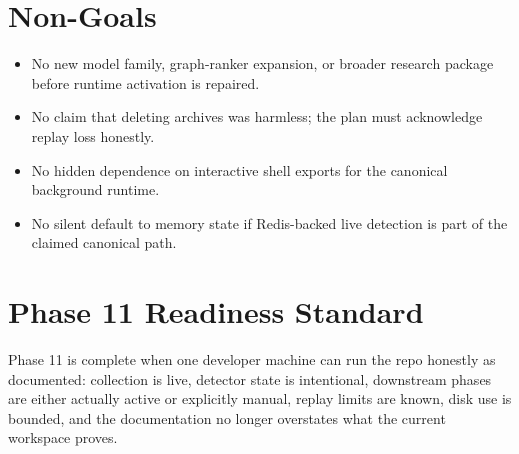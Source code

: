 \documentclass{article}
\begin{document}
\section*{Non-Goals}
\begin{itemize}
\item No new model family, graph-ranker expansion, or broader research package before runtime activation is repaired.
\item No claim that deleting archives was harmless; the plan must acknowledge replay loss honestly.
\item No hidden dependence on interactive shell exports for the canonical background runtime.
\item No silent default to memory state if Redis-backed live detection is part of the claimed canonical path.
\end{itemize}

\section*{Phase 11 Readiness Standard}
Phase 11 is complete when one developer machine can run the repo honestly as documented: collection is live, detector state is intentional, downstream phases are either actually active or explicitly manual, replay limits are known, disk use is bounded, and the documentation no longer overstates what the current workspace proves.
\end{document}

